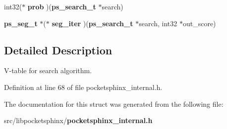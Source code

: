 \begin{DoxyCompactItemize}
\item 
int32($\ast$ {\bfseries prob} )({\bf ps\-\_\-search\-\_\-t} $\ast$search)\label{structps__searchfuncs__s_abf94b8e4523c3f3c39fde4454f78fe16}

\item 
{\bf ps\-\_\-seg\-\_\-t} $\ast$($\ast$ {\bfseries seg\-\_\-iter} )({\bf ps\-\_\-search\-\_\-t} $\ast$search, int32 $\ast$out\-\_\-score)\label{structps__searchfuncs__s_a6b27a306eac9b96f05413aa8d6b9da61}

\end{DoxyCompactItemize}


\subsection{Detailed Description}
V-\/table for search algorithm. 

Definition at line 68 of file pocketsphinx\-\_\-internal.\-h.



The documentation for this struct was generated from the following file\-:\begin{DoxyCompactItemize}
\item 
src/libpocketsphinx/{\bf pocketsphinx\-\_\-internal.\-h}\end{DoxyCompactItemize}
